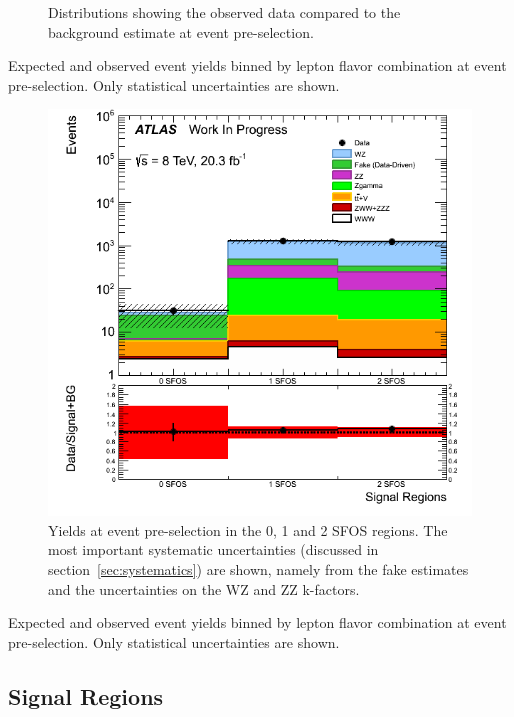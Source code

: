 \begin{figure}[ht!]
\caption{Distributions showing the observed data compared to the background estimate at event pre-selection.}
\label{fig:preselection}
\end{figure}

\begin{table}[ht!]
\centering

\caption{Expected and observed event yields binned by lepton flavor combination at event pre-selection.
Only statistical uncertainties are shown.
}
\label{tab:preselection}
\end{table}

\begin{figure}[ht!]
\centering
\includegraphics[width=0.5\columnwidth]{figures/preselection/NSFOS_Logy_histratio.png}
\caption{Yields at event pre-selection in the 0, 1 and 2 SFOS regions.  The most important systematic uncertainties 
(discussed in section~\ref{sec:systematics}) are shown, namely from the fake estimates and the uncertainties on the WZ and ZZ k-factors.}
\label{fig:preselection_nsfos}
\end{figure}

\begin{table}[ht!]
\centering

\caption{Expected and observed event yields binned by lepton flavor combination at event pre-selection.
Only statistical uncertainties are shown.
}
\label{tab:preselection}
\end{table}


\clearpage
\subsection{Signal Regions}
\label{sec:signal_yield}

